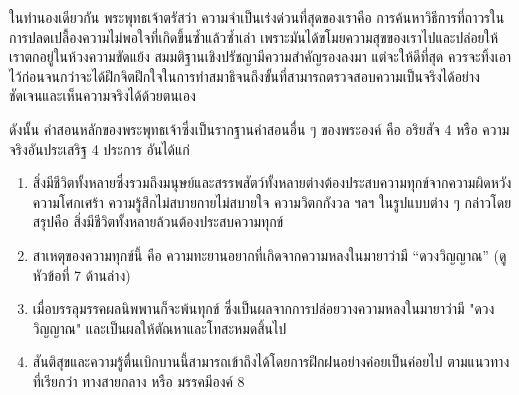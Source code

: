 \documentclass[12pt, openany]{book}
\begin{document}
ใน{\wbr}ทํา{\wbr}นอง{\wbr}เดียวกัน พระพุทธเจ้า{\wbr}ตรัส{\wbr}ว่า ความ{\wbr}จํา{\wbr}เป็น{\wbr}เร่งด่วน{\wbr}ที่สุด{\wbr}ของ{\wbr}เรา{\wbr}คือ การ{\wbr}ค้น{\wbr}หา{\wbr}วิธีการ{\wbr}ที่{\wbr}ถาวร{\wbr}ใน{\wbr}การ{\wbr}ปลดเปลื้อง{\wbr}ความ{\wbr}ไม่{\wbr}พอใจ{\wbr}ที่{\wbr}เกิด{\wbr}ขึ้น{\wbr}ซ้ำ{\wbr}แล้ว{\wbr}ซ้ำ{\wbr}เล่า เพราะ{\wbr}มัน{\wbr}ได้{\wbr}ขโมย{\wbr}ความ{\wbr}สุข{\wbr}ของ{\wbr}เรา{\wbr}ไป{\wbr}และ{\wbr}ปล่อย{\wbr}ให้{\wbr}เรา{\wbr}ตก{\wbr}อยู่{\wbr}ใน{\wbr}ห้วง{\wbr}ความ{\wbr}ขัดแย้ง  สมมติฐาน{\wbr}เชิง{\wbr}ปรัชญา{\wbr}มี{\wbr}ความ{\wbr}สําคัญ{\wbr}รอง{\wbr}ลง{\wbr}มา แต่{\wbr}จะ{\wbr}ให้{\wbr}ดี{\wbr}ที่สุด ควร{\wbr}จะ{\wbr}ทิ้ง{\wbr}เอา{\wbr}ไว้{\wbr}ก่อน{\wbr}จน{\wbr}กว่า{\wbr}จะ{\wbr}ได้{\wbr}ฝึก{\wbr}จิต{\wbr}ฝึก{\wbr}ใจ{\wbr}ใน{\wbr}การ{\wbr}ทํา{\wbr}สมาธิ{\wbr}จน{\wbr}ถึง{\wbr}ขั้น{\wbr}ที่{\wbr}สามารถ{\wbr}ตรวจสอบ{\wbr}ความ{\wbr}เป็น{\wbr}จริง{\wbr}ได้{\wbr}อย่าง{\wbr}ชัดเจน{\wbr}และ{\wbr}เห็น{\wbr}ความ{\wbr}จริง{\wbr}ได้{\wbr}ด้วย{\wbr}ตนเอง{\wbr}

ดังนั้น คําสอน{\wbr}หลัก{\wbr}ของ{\wbr}พระพุทธเจ้า{\wbr}ซึ่ง{\wbr}เป็น{\wbr}รากฐาน{\wbr}คํา{\wbr}สอน{\wbr}อื่น ๆ ของ{\wbr}พระองค์ คือ อริยสัจ 4 หรือ ความ{\wbr}จริง{\wbr}อัน{\wbr}ประเสริฐ 4 ประการ อัน{\wbr}ได้แก่{\wbr}

\newpage

\begin{enumerate}[noitemsep]

\item สิ่ง{\wbr}มี{\wbr}ชีวิต{\wbr}ทั้งหลาย{\wbr}ซึ่ง{\wbr}รวม{\wbr}ถึง{\wbr}มนุษย์{\wbr}และ{\wbr}สรรพ{\wbr}สัตว์{\wbr}ทั้งหลาย{\wbr}ต่าง{\wbr}ต้อง{\wbr}ประสบ{\wbr}ความ{\wbr}ทุกข์{\wbr}จาก{\wbr}ความ{\wbr}ผิดหวัง ความ{\wbr}โศกเศร้า ความ{\wbr}รู้สึก{\wbr}ไม่{\wbr}สบาย{\wbr}กาย{\wbr}ไม่{\wbr}สบายใจ ความ{\wbr}วิตก{\wbr}กังวล ฯลฯ ใน{\wbr}รูปแบบ{\wbr}ต่าง ๆ   กล่าว{\wbr}โดย{\wbr}สรุป{\wbr}คือ สิ่ง{\wbr}มี{\wbr}ชีวิต{\wbr}ทั้งหลาย{\wbr}ล้วน{\wbr}ต้อง{\wbr}ประสบ{\wbr}ความ{\wbr}ทุกข์{\wbr}

\item สาเหตุ{\wbr}ของ{\wbr}ความ{\wbr}ทุกข์{\wbr}นี้ คือ ความ{\wbr}ทะยาน{\wbr}อยาก{\wbr}ที่{\wbr}เกิด{\wbr}จาก{\wbr}ความ{\wbr}หลง{\wbr}ใน{\wbr}มายา{\wbr}ว่า{\wbr}มี “ดวงวิญญาณ”  (ดู{\wbr}หัวข้อ{\wbr}ที่ 7 ด้าน{\wbr}ล่าง)

\item เมื่อ{\wbr}บรรลุ{\wbr}มรรคผล{\wbr}นิพพาน{\wbr}ก็{\wbr}จะ{\wbr}พ้น{\wbr}ทุกข์ ซึ่ง{\wbr}เป็น{\wbr}ผล{\wbr}จาก{\wbr}การ{\wbr}ปล่อย{\wbr}วาง{\wbr}ความ{\wbr}หลง{\wbr}ใน{\wbr}มายา{\wbr}ว่า{\wbr}มี "ดวง{\wbr}วิญญาณ" และ{\wbr}เป็น{\wbr}ผล{\wbr}ให้{\wbr}ตัณหา{\wbr}และ{\wbr}โทสะ{\wbr}หมด{\wbr}สิ้น{\wbr}ไป 

\item สันติสุข{\wbr}และ{\wbr}ความ{\wbr}รู้{\wbr}ตื่น{\wbr}เบิกบาน{\wbr}นี้{\wbr}สามารถ{\wbr}เข้าถึง{\wbr}ได้{\wbr}โดย{\wbr}การ{\wbr}ฝึกฝน{\wbr}อย่าง{\wbr}ค่อย{\wbr}เป็น{\wbr}ค่อย{\wbr}ไป ตาม{\wbr}แนวทาง{\wbr}ที่{\wbr}เรียก{\wbr}ว่า ทาง{\wbr}สาย{\wbr}กลาง หรือ มรรค{\wbr}มี{\wbr}องค์ 8

    \end{enumerate}
\end{document}
